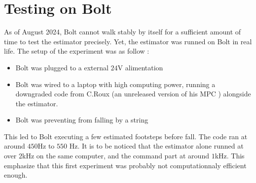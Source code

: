 \documentclass[a4paper,10pt]{article}
\begin{document}
\section{Testing on Bolt}
As of August 2024, Bolt cannot walk stably by itself for a sufficient amount of time to test the estimator precisely. Yet, the estimator was runned on Bolt in real life. The setup of the experiment was as follow : 
\begin{itemize}[noitemsep,topsep=0.5pt,parsep=0.1pt,partopsep=0.1pt]
  \item Bolt was plugged to a external $24$V alimentation
  \item Bolt was wired to a laptop with high computing power, running a downgraded code from C.Roux \cite{15} (an unreleased version of his MPC \cite{1}) alongside the estimator.
  \item Bolt was preventing from falling by a string
\end{itemize}
This led to Bolt executing a few estimated footsteps before fall. The code ran at around $450$Hz to $550$ Hz. It is to be noticed that the estimator alone runned at over $2$kHz on the same computer, and the command part at around $1$kHz. This emphasize that this first experiment was probably not computationnaly efficient enough.
\end{document}
